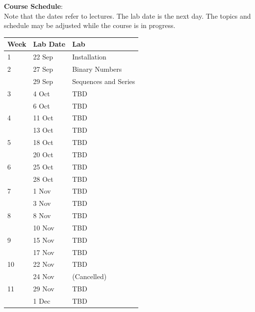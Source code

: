 \documentclass[12pt]{article}
\begin{document}
\newpage


\noindent
\textbf {Course Schedule}:\\
Note that the dates refer to lectures.  The lab date is the next day.
The topics and schedule may be adjusted while the course is in
progress.\\


\begin{table}[h!]
\normalsize %
\begin{tabular}{ lll }
\hline
\textbf{Week} & \textbf{Lab Date} & \textbf{Lab} \\
\hline
1  & 22 Sep & Installation \\
\hline
2  & 27 Sep & Binary Numbers \\
   & 29 Sep & Sequences and Series \\
\hline
3  & 4 Oct  & TBD \\
   & 6 Oct  & TBD \\
\hline
4  & 11 Oct & TBD \\
   & 13 Oct & TBD \\
\hline
5  & 18 Oct & TBD \\
   & 20 Oct & TBD \\
\hline
6  & 25 Oct & TBD \\
   & 28 Oct & TBD \\
\hline
7  & 1 Nov  & TBD \\
   & 3 Nov  & TBD \\
\hline
8  & 8 Nov  & TBD \\
   & 10 Nov & TBD \\
\hline
9  & 15 Nov & TBD \\
   & 17 Nov & TBD \\
\hline
10 & 22 Nov & TBD \\
   & 24 Nov & (Cancelled)\\
\hline
11 & 29 Nov & TBD \\
   & 1 Dec  & TBD \\
\hline
\end{tabular} 
\end{table}
\end{document}
